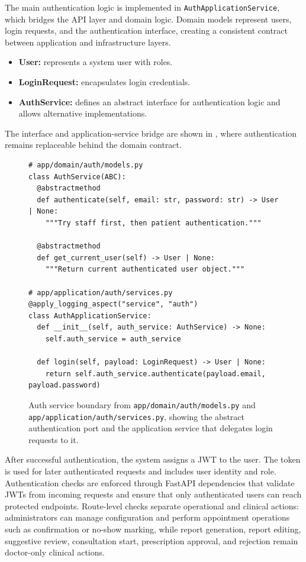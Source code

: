 The main authentication logic is implemented in \texttt{AuthApplicationService}, which bridges the API layer and domain logic. Domain models represent users, login requests, and the authentication interface, creating a consistent contract between application and infrastructure layers.

\begin{itemize}
  \item \textbf{User:} represents a system user with roles.
  \item \textbf{LoginRequest:} encapsulates login credentials.
  \item \textbf{AuthService:} defines an abstract interface for authentication logic and allows alternative implementations.
\end{itemize}

The interface and application-service bridge are shown in , where authentication remains replaceable behind the domain contract.

\begin{figure}[htbp]
\centering
\begin{minipage}{0.92\textwidth}
\begin{verbatim}
# app/domain/auth/models.py
class AuthService(ABC):
  @abstractmethod
  def authenticate(self, email: str, password: str) -> User | None:
    """Try staff first, then patient authentication."""

  @abstractmethod
  def get_current_user(self) -> User | None:
    """Return current authenticated user object."""

# app/application/auth/services.py
@apply_logging_aspect("service", "auth")
class AuthApplicationService:
  def __init__(self, auth_service: AuthService) -> None:
    self.auth_service = auth_service

  def login(self, payload: LoginRequest) -> User | None:
    return self.auth_service.authenticate(payload.email, payload.password)
\end{verbatim}
\end{minipage}
\caption{Auth service boundary from \texttt{app/domain/auth/models.py} and \texttt{app/application/auth/services.py}, showing the abstract authentication port and the application service that delegates login requests to it.}
\label{fig:implementation-auth-service}
\end{figure}
\FloatBarrier

After successful authentication, the system assigns a JWT to the user. The token is used for later authenticated requests and includes user identity and role. Authentication checks are enforced through FastAPI dependencies that validate JWTs from incoming requests and ensure that only authenticated users can reach protected endpoints. Route-level checks separate operational and clinical actions: administrators can manage configuration and perform appointment operations such as confirmation or no-show marking, while report generation, report editing, suggestive review, consultation start, prescription approval, and rejection remain doctor-only clinical actions.

